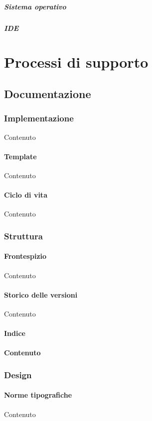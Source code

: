         		\subparagraph{Sistema operativo}\label{PP:Sviluppo:Strumenti:AmbienteSviluppo:SistemaOperativo}
        		
        		\subparagraph{IDE}\label{PP:Sviluppo:Strumenti:AmbienteSviluppo:IDE}
        
		
		
\section{Processi di supporto}\label{PS}	

	\subsection{Documentazione}\label{PS:Documentazione}
	
		
		\subsubsection{Implementazione}\label{PS:Documentazione:Implementazione}
		Contenuto
		
			\paragraph{Template}\label{PS:Documentazione:Implementazione:Template}
			Contenuto
			
			\paragraph{Ciclo di vita}\label{PS:Documentazione:Implementazione:CicloVita}
			Contenuto
			
		\subsubsection{Struttura}\label{PS:Documentazione:Struttura}
		
			\paragraph{Frontespizio}\label{PS:Documentazione:Struttura:Frontespizio}
			Contenuto
			
			\paragraph{Storico delle versioni}\label{PS:Documentazione:Struttura:StoricoVersioni}	
			Contenuto
			
			\paragraph{Indice}\label{PS:Documentazione:Struttura:Indice}
			
			\paragraph{Contenuto}\label{PS:Documentazione:Struttura:Contenuto}
			

		\subsubsection{Design}\label{PS:Documentazione:Design}
		
			\paragraph{Norme tipografiche}\label{PS:Documentazione:Design:NormeT}
			Contenuto
	